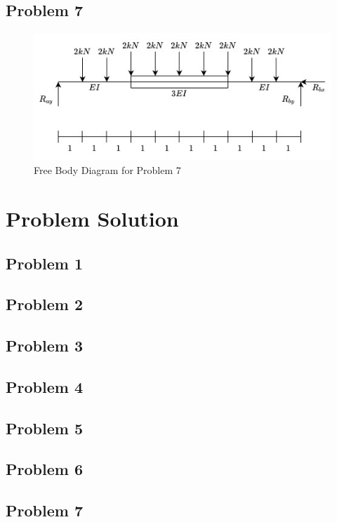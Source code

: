 \documentclass[a4paper]{article}
\begin{document}
\subsection{Problem 7}

\begin{figure}[h]
\includegraphics[width=\textwidth]{FBD/FBD_7.jpg}
\caption{Free Body Diagram for Problem 7}
\label{FBD_7}
\end{figure}


\section{Problem Solution} \label{Solutions}
\subsection{Problem 1}
\lipsum[1]
\subsection{Problem 2}
\lipsum[1]
\subsection{Problem 3}
\lipsum[1]
\subsection{Problem 4}
\lipsum[1]
\subsection{Problem 5}
\lipsum[1]
\subsection{Problem 6}
\lipsum[1]
\subsection{Problem 7}
\lipsum[1]
\end{document}
